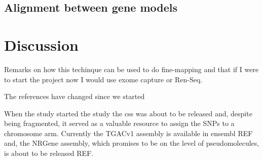 

\subsection{Alignment between gene models}

\section{Discussion} 
Remarks on how this techinque can be used to do fine-mapping and that if I were to start the project now I would  use exome capture or Ren-Seq. 

The references have changed since we started

When the study started the study the \gls{css} was about to be released and, despite being fragmented, it served as a valuable resource to assign the SNPs to a chromosome arm. Currently the TGACv1 assembly is available in ensembl REF and,  the NRGene assembly, which promises to be on the level of pseudomolecules, is about to be released REF. 


